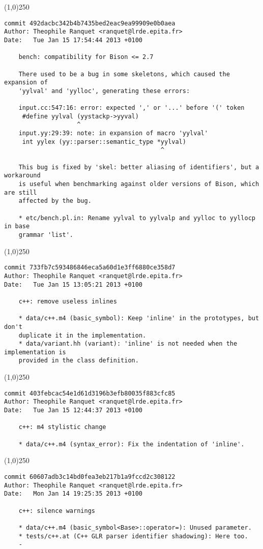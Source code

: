 \line(1,0){250}
\begin{verbatim}
commit 492dacbc342b4b7435bed2eac9ea99909e0b0aea
Author: Theophile Ranquet <ranquet@lrde.epita.fr>
Date:   Tue Jan 15 17:54:44 2013 +0100

    bench: compatibility for Bison <= 2.7
    
    There used to be a bug in some skeletons, which caused the expansion of
    'yylval' and 'yylloc', generating these errors:
    
    input.cc:547:16: error: expected ',' or '...' before '(' token
     #define yylval (yystackp->yyval)
                    ^
    input.yy:29:39: note: in expansion of macro 'yylval'
     int yylex (yy::parser::semantic_type *yylval)
                                           ^
    
    This bug is fixed by 'skel: better aliasing of identifiers', but a workaround
    is useful when benchmarking against older versions of Bison, which are still
    affected by the bug.
    
    * etc/bench.pl.in: Rename yylval to yylvalp and yylloc to yyllocp in base
    grammar 'list'.

\end{verbatim}
\line(1,0){250}
\begin{verbatim}
commit 733fb7c593486846eca5a60d1e3ff6880ce358d7
Author: Theophile Ranquet <ranquet@lrde.epita.fr>
Date:   Tue Jan 15 13:05:21 2013 +0100

    c++: remove useless inlines
    
    * data/c++.m4 (basic_symbol): Keep 'inline' in the prototypes, but don't
    duplicate it in the implementation.
    * data/variant.hh (variant): 'inline' is not needed when the implementation is
    provided in the class definition.

\end{verbatim}
\line(1,0){250}
\begin{verbatim}
commit 403febcac54e1d61d3196b3efb80035f883cfc85
Author: Theophile Ranquet <ranquet@lrde.epita.fr>
Date:   Tue Jan 15 12:44:37 2013 +0100

    c++: m4 stylistic change
    
    * data/c++.m4 (syntax_error): Fix the indentation of 'inline'.

\end{verbatim}
\line(1,0){250}
\begin{verbatim}
commit 60607adb3c14bd0fea3eb217b1a9fccd2c308122
Author: Theophile Ranquet <ranquet@lrde.epita.fr>
Date:   Mon Jan 14 19:25:35 2013 +0100

    c++: silence warnings
    
    * data/c++.m4 (basic_symbol<Base>::operator=): Unused parameter.
    * tests/c++.at (C++ GLR parser identifier shadowing): Here too.
    -

\end{verbatim}
